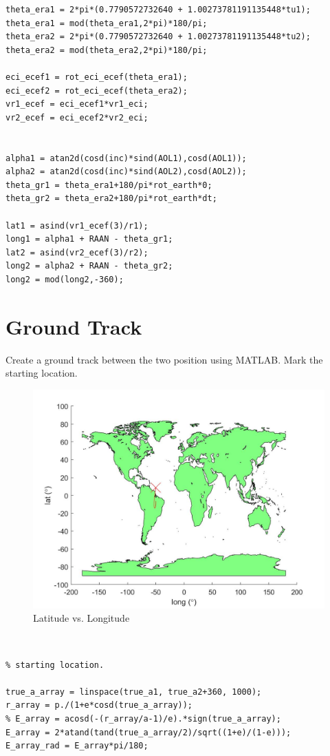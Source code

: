 \documentclass[hidelinks,12pt]{article}
\begin{document}
\begin{flushleft}
\begin{lstlisting}[frame=lines,style=Matlab-editor,basicstyle = \mlttfamily]
theta_era1 = 2*pi*(0.7790572732640 + 1.00273781191135448*tu1);
theta_era1 = mod(theta_era1,2*pi)*180/pi;
theta_era2 = 2*pi*(0.7790572732640 + 1.00273781191135448*tu2);
theta_era2 = mod(theta_era2,2*pi)*180/pi;

eci_ecef1 = rot_eci_ecef(theta_era1);
eci_ecef2 = rot_eci_ecef(theta_era2);
vr1_ecef = eci_ecef1*vr1_eci;
vr2_ecef = eci_ecef2*vr2_eci;


alpha1 = atan2d(cosd(inc)*sind(AOL1),cosd(AOL1));
alpha2 = atan2d(cosd(inc)*sind(AOL2),cosd(AOL2));
theta_gr1 = theta_era1+180/pi*rot_earth*0;
theta_gr2 = theta_era2+180/pi*rot_earth*dt;

lat1 = asind(vr1_ecef(3)/r1);
long1 = alpha1 + RAAN - theta_gr1;
lat2 = asind(vr2_ecef(3)/r2);
long2 = alpha2 + RAAN - theta_gr2;
long2 = mod(long2,-360);
\end{lstlisting}
\newpage
\section{Ground Track}
Create a ground track between the two position using MATLAB. Mark the starting location.
\begin{figure}[!htb]
  \center
  \includegraphics[scale=0.4]{LATLONG}
  \caption{Latitude vs. Longitude}
  \label{}
\end{figure}\\
\begin{lstlisting}[frame=lines,style=Matlab-editor,basicstyle = \mlttfamily]
% 5. Create a ground track between the two positions using MATLAB. Mark the
% starting location.

true_a_array = linspace(true_a1, true_a2+360, 1000);
r_array = p./(1+e*cosd(true_a_array));
% E_array = acosd(-(r_array/a-1)/e).*sign(true_a_array);
E_array = 2*atand(tand(true_a_array/2)/sqrt((1+e)/(1-e)));
E_array_rad = E_array*pi/180;


\end{lstlisting}
\end{flushleft}
\end{document}
